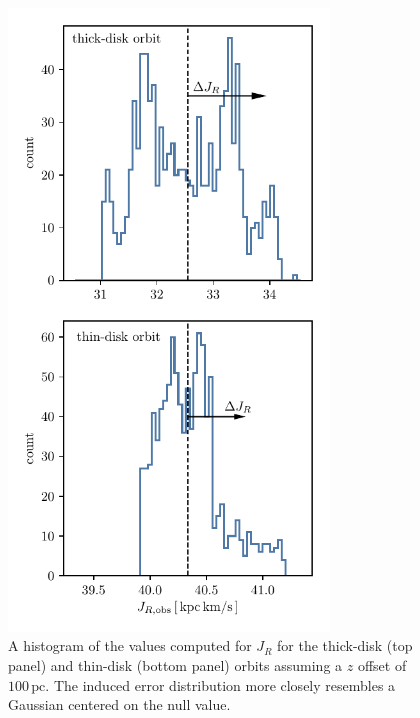 \documentclass[twocolumn]{aastex62}
\newcommand{\pc}{\text{pc}}
\begin{document}
\begin{figure}
\begin{center}
\includegraphics[width=3.35224200913in]{fig/schmactions_JR_zerr_hist.pdf}
\end{center}
\caption{A histogram of the values computed for $J_R$ for the thick-disk (top
panel) and thin-disk (bottom panel) orbits assuming a $z$ offset of
$100\,\pc$. The induced error distribution more closely resembles a Gaussian
centered on the null value.}
\label{fig:JR_zerr_hist}
\end{figure}
\end{document}
